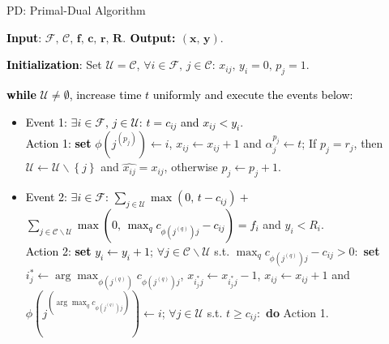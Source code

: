 \documentclass[10pt]{llncs}
\begin{document}
\begin{algorithm}[H]
{\small \caption{PD: Primal-Dual Algorithm}
}{\small \par}

\textbf{\textcolor{black}{Input}}\textcolor{black}{: }$\mathcal{F},\,\mathcal{C},\,\boldsymbol{f},\,\boldsymbol{c},\,\boldsymbol{r},\,\boldsymbol{R}$.\textbf{\textcolor{black}{{}
Output: }}$\left(\boldsymbol{x},\,\boldsymbol{y}\right)$.

\textbf{\textcolor{black}{Initialization}}\textcolor{black}{: }Set
$\mathcal{U}=\mathcal{C}$, $\forall i\in\mathcal{F},\, j\in\mathcal{C}:\, x_{ij},\, y_{i}=0,\, p_{j}=1$.

\medskip{}


\textbf{\textcolor{black}{while}}\textcolor{black}{{} $\mathcal{U}\neq\emptyset$,
increase time $t$ uniformly and execute the events below:} 
\begin{itemize}
\item \textcolor{black}{Event 1: $\exists i\in\mathcal{F},\, j\in\mathcal{U}$:
$t=c_{ij}$ and $x_{ij}<y_{i}$}.\\
\textcolor{black}{Action 1: }\textbf{\textcolor{black}{set}}\textcolor{black}{{}
}$\phi\left(j^{\left(p_{j}\right)}\right)\leftarrow i$, $x_{ij}\leftarrow x_{ij}+1$
and $\alpha_{j}^{p_{j}}\leftarrow t$; If $p_{j}=r_{j}$, then\textbf{
$\mathcal{U}\leftarrow\mathcal{U}\backslash\left\{ j\right\} $} and
$\hat{x_{ij}}=x_{ij}$, otherwise $p_{j}\leftarrow p_{j}+1$.\textcolor{black}{{}
}\smallskip{}

\item \textcolor{black}{Event 2: $\exists i\in\mathcal{F}$: $\sum_{j\in\mathcal{U}}\max\left(0,\, t-c_{ij}\right)+$$\sum_{j\in\mathcal{C}\backslash\mathcal{U}}\max\left(0,\,\max_{q}c_{\phi\left(j^{\left(q\right)}\right)j}-c_{ij}\right)=f_{i}$}
and $y_{i}<R_{i}$.\\
\textcolor{black}{Action 2: }\textbf{\textcolor{black}{set}}\textcolor{black}{{}
$y_{i}\leftarrow y_{i}+1$}; $\forall j\in\mathcal{C}\backslash\mathcal{U}$
s.t. $\max_{q}c_{\phi\left(j^{\left(q\right)}\right)j}-c_{ij}>0:$
\textbf{set} $i_{j}^{*}\leftarrow\arg\max_{\phi\left(j^{\left(q\right)}\right)}c_{\phi\left(j^{\left(q\right)}\right)j}$,
$x_{i_{j}^{*}j}\leftarrow x_{i_{j}^{*}j}-1$, $x_{ij}\leftarrow x_{ij}+1$
and $\phi\left(j^{\left(\arg\max_{q}c_{\phi\left(j^{\left(q\right)}\right)j}\right)}\right)\leftarrow i$;
$\forall j\in\mathcal{\mathcal{U}}$ s.t. $t\geq c_{ij}:$ \textbf{do}
Action 1.\end{itemize}
\end{algorithm}
\end{document}
